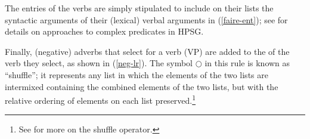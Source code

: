 \documentclass[output=paper
 	        ,biblatex
                ,babelshorthands
                ,newtxmath
                ,draftmode
                ,colorlinks, citecolor=brown
]{langscibook}
\begin{document}
The entries of the  verbs are simply stipulated to include on their \argst lists the syntactic arguments of their (lexical) verbal arguments in (\ref{faire-ent}); see  for details on approaches to complex predicates in HPSG.

\begin{exe}
\ex\label{faire-ent}
\end{exe} 

\noindent

Finally, (negative) adverbs that select for a verb (VP) are added to the \argst of the verb they select, as shown in (\ref{neg-lr}). 
The symbol $\bigcirc$\is{$\bigcirc$} in this rule is known as ``shuffle''; it represents any list 
 in which the elements of the two lists are intermixed
containing the combined elements of the two lists, but with the relative ordering of elements on each list preserved.\footnote{
See \crossrefchapterw[\pageref{order:rel-shuffle}]{order} for more on the shuffle operator.}
\end{document}
